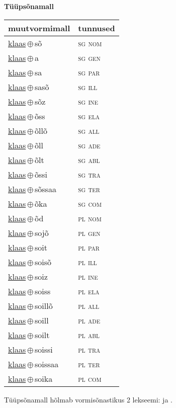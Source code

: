 

\vspace{3.5em}
\noindent \begin{minipage}{\textwidth}
\noindent \textbf{Tüüpsõnamall \,}\\

\begin{sideways}
\begin{tabular}{l l}
muutvormimall & tunnused \\
\hline
\underline{klaas}\,$\oplus$\,sõ & \textsc{ sg nom } \\
\underline{klaas}\,$\oplus$\,a & \textsc{ sg gen } \\
\underline{klaas}\,$\oplus$\,sa & \textsc{ sg par } \\
\underline{klaas}\,$\oplus$\,sasõ & \textsc{ sg ill } \\
\underline{klaas}\,$\oplus$\,sõz & \textsc{ sg ine } \\
\underline{klaas}\,$\oplus$\,õss & \textsc{ sg ela } \\
\underline{klaas}\,$\oplus$\,õllõ & \textsc{ sg all } \\
\underline{klaas}\,$\oplus$\,õll & \textsc{ sg ade } \\
\underline{klaas}\,$\oplus$\,õlt & \textsc{ sg abl } \\
\underline{klaas}\,$\oplus$\,õssi & \textsc{ sg tra } \\
\underline{klaas}\,$\oplus$\,sõssaa & \textsc{ sg ter } \\
\underline{klaas}\,$\oplus$\,õka & \textsc{ sg com } \\
\underline{klaas}\,$\oplus$\,õd & \textsc{ pl nom } \\
\underline{klaas}\,$\oplus$\,sojõ & \textsc{ pl gen } \\
\underline{klaas}\,$\oplus$\,soit & \textsc{ pl par } \\
\underline{klaas}\,$\oplus$\,soisõ & \textsc{ pl ill } \\
\underline{klaas}\,$\oplus$\,soiz & \textsc{ pl ine } \\
\underline{klaas}\,$\oplus$\,soiss & \textsc{ pl ela } \\
\underline{klaas}\,$\oplus$\,soillõ & \textsc{ pl all } \\
\underline{klaas}\,$\oplus$\,soill & \textsc{ pl ade } \\
\underline{klaas}\,$\oplus$\,soilt & \textsc{ pl abl } \\
\underline{klaas}\,$\oplus$\,soissi & \textsc{ pl tra } \\
\underline{klaas}\,$\oplus$\,soissaa & \textsc{ pl ter } \\
\underline{klaas}\,$\oplus$\,soika & \textsc{ pl com } \\
\end{tabular}
\end{sideways}
\label{tab:tüüpsõnamall-klaassõ}

\end{minipage}

 
\vspace{1em}
\noindent Tüüpsõnamall  hõlmab vormisõnastikus 2 lekseemi:  ja .
